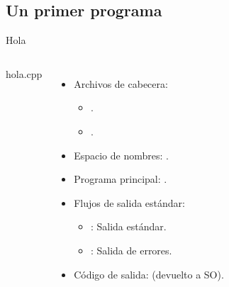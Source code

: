 \subsection{Un primer programa}

\begin{frame}{Hola}
\begin{columns}[T]

\begin{block}{hola.cpp}

\end{block}

  \begin{itemize}
    \item Archivos de cabecera: 
      \begin{itemize}
        \item {}.
        \item {}.
      \end{itemize}
    \item Espacio de nombres: .
    \item Programa principal: .
    \item Flujos de salida estándar: 
        \begin{itemize}
          \item {}: Salida estándar.
          \item {}: Salida de errores.
        \end{itemize}
    \item Código de salida:  (devuelto a SO).
  \end{itemize}

\end{columns}
\end{frame}
